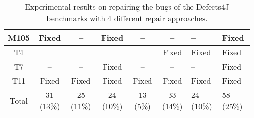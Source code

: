 \begin{table}[!t]
{\begin{tabular}{|c|c|c|c|c|c|}
M105              & Fixed     & --        & Fixed     & --        & --        & --        &Fixed   \\
\hline
T4                & --        & --        & --        & --        & Fixed     & Fixed     &Fixed   \\
T7                & --        & --        & Fixed     & --        & --        & --        &Fixed   \\
T11               & Fixed     & Fixed     & Fixed     & Fixed     & Fixed     & Fixed     &Fixed   \\
\hline
Total             & 31 (13\%) & 25 (11\%) & 24 (10\%) & 13 (5\%)  & 33 (14\%) & 24 (10\%) & 58 (25\%)\\
\hline 
\end{tabular}%
}
\caption{Experimental results on repairing the bugs of the Defects4J benchmarks with 4 different repair approaches.}
\end{table}
